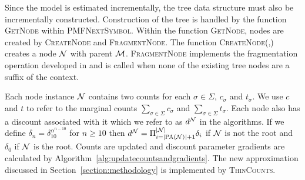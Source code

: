 Since the model is estimated incrementally, the tree data structure must also be incrementally constructed.  Construction of the tree is handled by the function \textsc{GetNode} within \textsc{PMFNextSymbol}.  Within the function \textsc{GetNode}, nodes are created by \textsc{CreateNode} and \textsc{FragmentNode}. The function \textsc{CreateNode(\N,\M)} creates a node $\N$ with parent $\M$. \textsc{FragmentNode} implements the fragmentation operation developed in \citep{Wood2009} and is called when none of the existing tree nodes are a suffix of the context.  %

Each node instance $\N$ contains two counts for each $\sigma \in \Sigma$, $c_\sigma$ and $t_\sigma$.  We use $c$ and $t$ to refer to the marginal counts $\sum_{\sigma \in \Sigma} c_\sigma$ and $\sum_{\sigma \in \Sigma} t_\sigma$.  Each node also has a discount associated with it which we refer to as $d^\N$ in the algorithms. If we define $\delta_{n} = \delta_{10}^{\alpha^{n - 10}}$ for $n \geq 10$ then $d^{\N} = \Pi_{i =|\textsc{PA}(\N)| + 1}^{|\N|} \delta_{i}$ if $\N$ is not the root and $\delta_{0}$ if $\N$ is the root.  Counts are updated and discount parameter gradients are calculated by Algorithm~\ref{alg:updatecountsandgradients}.  The new approximation discussed in Section~\ref{section:methodology} is implemented by \textsc{ThinCounts}.


